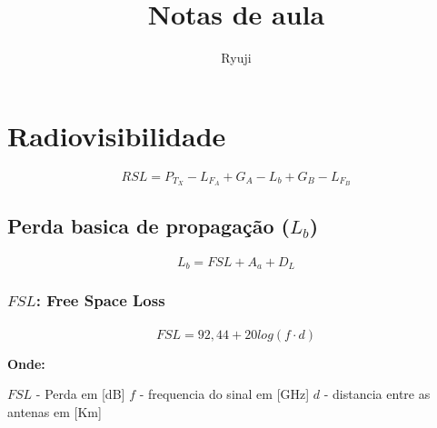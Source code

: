 \documentclass[11pt]{article} %
\title{Notas de aula}
\author{Ryuji}
\begin{document}
\maketitle
\newpage

\tableofcontents
\newpage


\section{Radiovisibilidade}

\paragraph{}

\begin{equation}
RSL = P_{T_{X}} - L_{F_{A}} + G_{A} - L_{b} + G_{B} - L_{F_{B}}
\end{equation}

\subsection{Perda basica de propagação ($L_b$)}

\paragraph{}

\begin{equation}
L_{b} = FSL + A_{a} + D_{L}
\end{equation}

\subsubsection{$FSL$: Free Space Loss}

\paragraph{}

\begin{equation}
FSL = 92,44 + 20log(f \cdot d)
\end{equation}

\textbf{Onde:}

$FSL$ - Perda em [dB] \newline
$f$ - frequencia do sinal em [GHz] \newline
$d$ - distancia entre as antenas em [Km]
\end{document}
